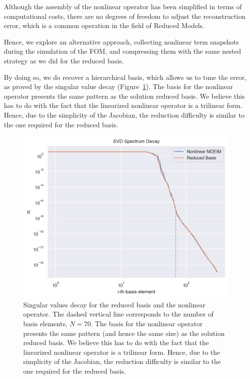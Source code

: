 \documentclass[../../thesis.tex]{subfiles}
\begin{document}
Although the assembly of the nonlinear operator has been simplified
in terms of computational costs,
there are no degrees of freedom to adjust the reconstruction error,
which is a common operation in the field of Reduced Models.

Hence, we explore an alternative approach, collecting nonlinear term snapshots 
during the simulation of the FOM, and compressing them with the same 
nested strategy as we did for the reduced basis.

By doing so, we do recover a hierarchical basis, which allows us to tune the error,
as proved by the singular value decay (Figure~\ref{fig:sigmas_decay_from_fom}).
The basis for the nonlinear operator presents the same pattern 
as the solution reduced basis.
We believe this has to do with the fact that the linearized nonlinear operator is a trilinear form.
Hence, due to the simplicity of the Jacobian, the reduction difficulty is similar to the one
required for the reduced basis.
\begin{figure}[h]
    \centering
    \includegraphics[width=1\columnwidth]{research_project/piston/figures/mdeim_certification/sigmas_problem_from_fom.png}
    \caption{Singular values decay for the reduced basis and the nonlinear operator.
    The dashed vertical line corresponds to the number of basis elements, $N=70$.
    The basis for the nonlinear operator presents the same pattern 
    (and hence the same size)
    as the solution reduced basis.
    We believe this has to do with the fact that the linearized nonlinear operator is a trilinear form.
    Hence, due to the simplicity of the Jacobian, the reduction difficulty is similar to the one
    required for the reduced basis.}
    \label{fig:sigmas_decay_from_fom}
\end{figure}
\end{document}
